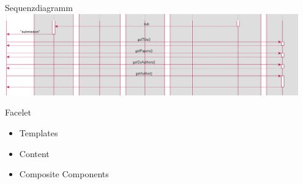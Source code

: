 \documentclass{beamer}
\begin{document}
    \begin{frame}{Sequenzdiagramm}
        \centering
        \includegraphics[width=0.95\textwidth]{excerpts/sequence1_3}
    \end{frame}

    \begin{frame}{Facelet}
        \begin{itemize}
            \item Templates
            \item Content
            \item Composite Components
        \end{itemize}
    \end{frame}
\end{document}
